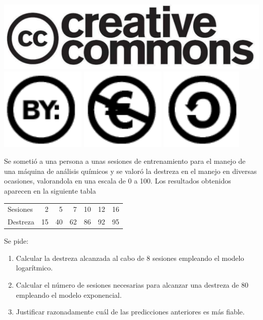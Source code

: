 \documentclass[aspectratio=149,10pt,xcolor=dvipsnames,t]{beamer}
\begin{document}
\begin{frame}[c]
\begin{center}
\biskip
\includegraphics[scale=0.07]{img/cc-logo}
\includegraphics[scale=0.2]{img/cc-by}
\includegraphics[scale=0.2]{img/cc-e}
\includegraphics[scale=0.2]{img/cc-c}\end{center}
\end{frame}

\begin{frame}[c]
Se sometió a una persona a unas sesiones de entrenamiento para el manejo de una máquina de análisis químicos y se valoró la destreza en el manejo en diversas ocasiones, valorandola en una escala de 0 a 100. 
Los resultados obtenidos aparecen en la siguiente tabla
\begin{center}
\begin{tabular}{lrrrrrr}
\hline
Sesiones & 2 & 5 & 7 & 10 & 12 & 16\\
Destreza & 15 & 40 & 62 & 86 & 92 & 95\\
\hline
\end{tabular}
\end{center} 
Se pide:
\begin{enumerate}
\item Calcular la destreza alcanzada al cabo de 8 sesiones empleando el modelo logarítmico. 
\item Calcular el número de sesiones necesarias para alcanzar una destreza de 80 empleando el modelo exponencial.
\item Justificar razonadamente cuál de las predicciones anteriores es más fiable. 
\end{enumerate}
\end{frame}
\end{document}

